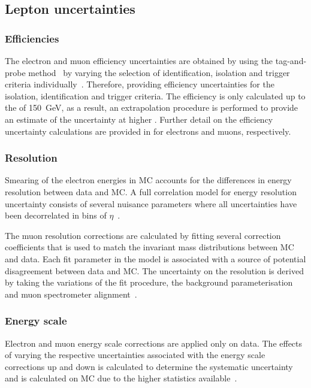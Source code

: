 \subsection{Lepton uncertainties}

\subsubsection{Efficiencies}
The electron and muon efficiency uncertainties are obtained by using the tag-and-probe method~\cite{Aaboud:2016vfy,Aad:2016jkr} by varying the selection of identification, isolation and trigger criteria individually~\cite{Aad:2019tso,Aad:2016jkr}. Therefore, providing efficiency uncertainties for the isolation, identification and trigger criteria. The efficiency is only calculated up to the \et of \SI{150}{\giga\electronvolt}, as a result, an extrapolation procedure is performed to provide an estimate of the uncertainty at higher \et. Further detail on the efficiency uncertainty calculations are provided in \cite{Aad:2019tso,Aad:2016jkr} for electrons and muons, respectively. 

\subsubsection{Resolution}
Smearing of the electron energies in MC accounts for the differences in energy resolution between data and MC. A full correlation model for energy resolution uncertainty consists of several nuisance parameters where all uncertainties have been decorrelated in bins of $\eta$~\cite{Aad:2019tso}.

The muon resolution corrections are calculated by fitting several correction coefficients that is used to match the invariant mass distributions between MC and data. Each fit parameter in the model is associated with a source of potential disagreement between data and MC. The uncertainty on the resolution is derived by taking the variations of the fit procedure, the background parameterisation and muon spectrometer alignment~\cite{Aad:2016jkr}. 

\subsubsection{Energy scale}
Electron and muon energy scale corrections are applied only on data. The effects of varying the respective uncertainties associated with the energy scale corrections up and down is calculated to determine the systematic uncertainty and is calculated on MC due to the higher statistics available~\cite{Aad:2019tso}. 

